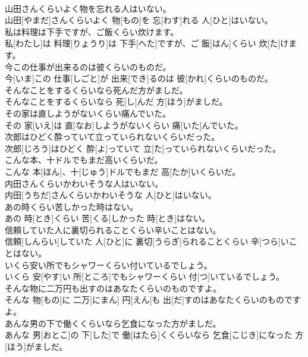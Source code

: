 \documentclass[8pt]{extreport}
\begin{document}
\begin{CJK}{UTF8}{min}
\\	山田さんくらいよく物を忘れる人はいない。	
\\	山田[やまだ]さんくらいよく 物[もの]を 忘[わす]れる 人[ひと]はいない。
\\	私は料理は下手ですが、ご飯くらい炊けます。	
\\	私[わたし]は 料理[りょうり]は 下手[へた]ですが、ご 飯[はん]くらい 炊[た]けます。
\\	今この仕事が出来るのは彼くらいのものだ。	
\\	今[いま]この 仕事[しごと]が 出来[でき]るのは 彼[かれ]くらいのものだ。
\\	そんなことをするくらいなら死んだ方がましだ。	
\\	そんなことをするくらいなら 死[し]んだ 方[ほう]がましだ。
\\	その家は直しようがないくらい痛んでいた。	
\\	その 家[いえ]は 直[なお]しようがないくらい 痛[いた]んでいた。
\\	次郎はひどく酔っていて立っていられないくらいだった。	
\\	次郎[じろう]はひどく 酔[よ]っていて 立[た]っていられないくらいだった。
\\	こんな本、十ドルでもまだ高いくらいだ。	
\\	こんな 本[ほん]、十[じゅう]ドルでもまだ 高[たか]いくらいだ。
\\	内田さんくらいかわいそうな人はいない。	
\\	内田[うちだ]さんくらいかわいそうな 人[ひと]はいない。
\\	あの時くらい苦しかった時はない。	
\\	あの 時[とき]くらい 苦[くる]しかった 時[とき]はない。
\\	信頼していた人に裏切られることくらい辛いことはない。	
\\	信頼[しんらい]していた 人[ひと]に 裏切[うらぎ]られることくらい 辛[つら]いことはない。
\\	いくら安い所でもシャワーくらい付いているでしょう。	
\\	いくら 安[やす]い 所[ところ]でもシャワーくらい 付[つ]いているでしょう。
\\	そんな物に二万円も出すのはあなたくらいのものですよ。	
\\	そんな 物[もの]に 二万[にまん] 円[えん]も 出[だ]すのはあなたくらいのものですよ。
\\	あんな男の下で働くくらいなら乞食になった方がましだ。	
\\	あんな 男[おとこ]の 下[した]で 働[はたら]くくらいなら 乞食[こじき]になった 方[ほう]がましだ。

\end{CJK}
\end{document}
